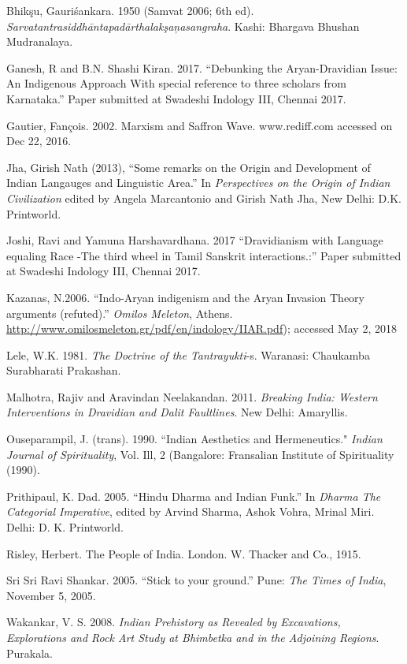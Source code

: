 \begin{thebibliography}{99}
 Bhikşu, Gauriśankara. 1950 (Samvat 2006; 6th ed). \textit{Sarvatantrasiddhāntapadārthalakşaņasangraha}. Kashi: Bhargava Bhushan Mudranalaya.

  Ganesh, R and B.N. Shashi Kiran. 2017. “Debunking the Aryan-Dravidian Issue: An Indigenous Approach With special reference to three scholars from Karnataka.” Paper submitted at Swadeshi Indology III, Chennai 2017.

  Gautier, Fançois. 2002. Marxism and Saffron Wave. www.rediff.com accessed on Dec 22, 2016. 

  Jha, Girish Nath (2013), “Some remarks on the Origin and Development of Indian Langauges and Linguistic Area.” In \textit{Perspectives on the Origin of Indian Civilization} edited by Angela Marcantonio and Girish Nath Jha, New Delhi: D.K. Printworld.

  Joshi, Ravi and Yamuna Harshavardhana. 2017 “Dravidianism with Language equaling Race -The third wheel in Tamil Sanskrit interactions.:” Paper submitted at Swadeshi Indology III, Chennai 2017.

  Kazanas, N.2006. “Indo-Aryan indigenism and the Aryan Invasion Theory arguments (refuted).” \textit{Omilos Meleton}, Athens. \url{http://www.omilosmeleton.gr/pdf/en/indology/IIAR.pdf}); accessed May 2, 2018

  Lele, W.K. 1981. \textit{The Doctrine of the Tantrayukti}-s. Waranasi: Chaukamba Surabharati Prakashan.

  Malhotra, Rajiv and Aravindan Neelakandan. 2011. \textit{Breaking India: Western Interventions in Dravidian and Dalit Faultlines}. New Delhi: Amaryllis.

  Ouseparampil, J. (trans). 1990. “Indian Aesthetics and Hermeneutics." \textit{Indian Journal of Spirituality}, Vol. Ill, 2 (Bangalore: Fransalian Institute of Spirituality (1990).

  Prithipaul, K. Dad. 2005. “Hindu Dharma and Indian Funk.” In \textit{Dharma The Categorial Imperative}, edited by Arvind Sharma, Ashok Vohra, Mrinal Miri. Delhi: D. K. Printworld.

  Risley, Herbert. The People of India. London. W. Thacker and Co., 1915.

  Sri Sri Ravi Shankar. 2005. “Stick to your ground.” Pune: \textit{The Times of India}, November 5, 2005.

  Wakankar, V. S. 2008. \textit{Indian Prehistory as Revealed by Excavations, Explorations and Rock Art Study at Bhimbetka and in the Adjoining Regions}. Purakala. 

 \end{thebibliography}

